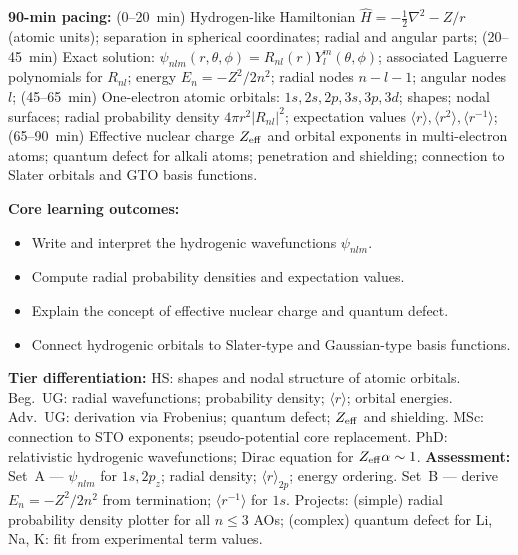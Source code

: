 \documentclass[11pt,a4paper]{article}
\begin{document}
\medskip

\begin{tcolorbox}[chembox, title={Module~III.2 --- Lecture L02: Hydrogenic Systems}]
\textbf{90-min pacing:} (0--20~min) Hydrogen-like Hamiltonian $\hat{H}=-\tfrac{1}{2}\nabla^2-Z/r$ (atomic units); separation in spherical coordinates; radial and angular parts; (20--45~min) Exact solution: $\psi_{nlm}(r,\theta,\phi)=R_{nl}(r)Y_l^m(\theta,\phi)$; associated Laguerre polynomials for $R_{nl}$; energy $E_n=-Z^2/2n^2$; radial nodes $n-l-1$; angular nodes $l$; (45--65~min) One-electron atomic orbitals: $1s,2s,2p,3s,3p,3d$; shapes; nodal surfaces; radial probability density $4\pi r^2|R_{nl}|^2$; expectation values $\langle r\rangle,\langle r^2\rangle,\langle r^{-1}\rangle$; (65--90~min) Effective nuclear charge $Z_{\rm eff}$ and orbital exponents in multi-electron atoms; quantum defect for alkali atoms; penetration and shielding; connection to Slater orbitals and GTO basis functions.

\medskip\textbf{Core learning outcomes:}
\begin{itemize}[leftmargin=1.4em,topsep=2pt,itemsep=1pt]
  \item Write and interpret the hydrogenic wavefunctions $\psi_{nlm}$.
  \item Compute radial probability densities and expectation values.
  \item Explain the concept of effective nuclear charge and quantum defect.
  \item Connect hydrogenic orbitals to Slater-type and Gaussian-type basis functions.
\end{itemize}
\medskip\textbf{Tier differentiation:}
HS: shapes and nodal structure of atomic orbitals.
Beg.\ UG: radial wavefunctions; probability density; $\langle r\rangle$; orbital energies.
Adv.\ UG: derivation via Frobenius; quantum defect; $Z_{\rm eff}$ and shielding.
MSc: connection to STO exponents; pseudo-potential core replacement.
PhD: relativistic hydrogenic wavefunctions; Dirac equation for $Z_{\rm eff}\alpha\sim1$.
\medskip\textbf{Assessment:}
Set~A --- $\psi_{nlm}$ for $1s,2p_z$; radial density; $\langle r\rangle_{2p}$; energy ordering.
Set~B --- derive $E_n=-Z^2/2n^2$ from termination; $\langle r^{-1}\rangle$ for $1s$.
Projects: (simple) radial probability density plotter for all $n\leq3$ AOs; (complex) quantum defect for Li, Na, K: fit from experimental term values.
\end{tcolorbox}

\medskip
\end{document}
